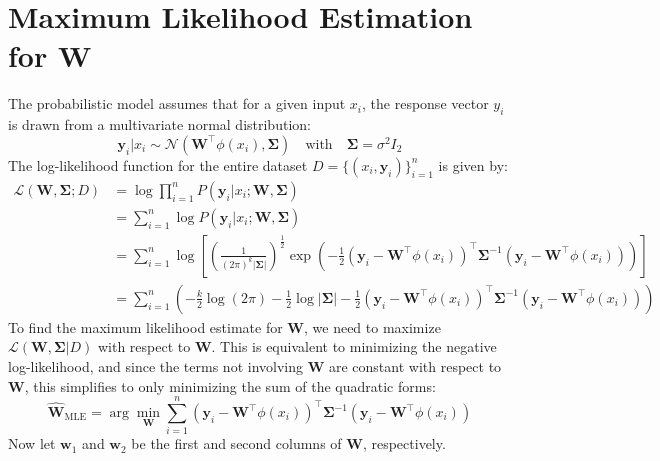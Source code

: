 \documentclass[11pt, a4paper, oneside]{memoir}
\begin{document}
\section[Maximum Likelihood Estimation for W]{Maximum Likelihood Estimation for $\mathbf{W}$}
The probabilistic model assumes that for a given input $x_i$, the response vector $y_i$ is drawn from a multivariate normal distribution:
\[ \mathbf{y}_i | x_i \sim \mathcal{N}(\mathbf{W}^\top\phi(x_i), \mathbf{\Sigma}) \quad \text{with} \quad \mathbf{\Sigma} = \sigma^2\mathit{I}_2 \]
The log-likelihood function for the entire dataset $D = \{(x_i, \mathbf{y}_i)\}_{i=1}^n$ is given by:
\begin{align*}
    \mathcal{L}(\mathbf{W}, \mathbf{\Sigma} ; D) & = \log \prod_{i=1}^n P(\mathbf{y}_i | x_i; \mathbf{W}, \mathbf{\Sigma})                                                                                                                                                                     \\
                                                 & = \sum_{i=1}^n \log P(\mathbf{y}_i | x_i; \mathbf{W}, \mathbf{\Sigma})                                                                                                                                                                      \\
                                                 & = \sum_{i=1}^n \log \left[ \left( \frac{1}{(2\pi)^k|\mathbf{\Sigma}|} \right)^{\frac{1}{2}} \exp\left(-\frac{1}{2}(\mathbf{y}_i - \mathbf{W}^\top\phi(x_i))^\top\mathbf{\Sigma}^{-1}(\mathbf{y}_i - \mathbf{W}^\top\phi(x_i))\right)\right] \\
                                                 & = \sum_{i=1}^n \left( -\frac{k}{2}\log(2\pi) - \frac{1}{2}\log|\mathbf{\Sigma}| - \frac{1}{2}(\mathbf{y}_i - \mathbf{W}^\top\phi(x_i))^\top\mathbf{\Sigma}^{-1}(\mathbf{y}_i - \mathbf{W}^\top\phi(x_i)) \right)
\end{align*}
To find the maximum likelihood estimate for $\mathbf{W}$, we need to maximize $\mathcal{L}(\mathbf{W}, \mathbf{\Sigma} | D)$ with respect to $\mathbf{W}$.
This is equivalent to minimizing the negative log-likelihood, and since the terms not involving $\mathbf{W}$ are constant with respect to $\mathbf{W}$,
this simplifies to only minimizing the sum of the quadratic forms:
\[ \hat{\mathbf{W}}_{\text{MLE}} = \arg\min_{\mathbf{W}} \sum_{i=1}^n (\mathbf{y}_i - \mathbf{W}^\top\phi(x_i))^\top\mathbf{\Sigma}^{-1}(\mathbf{y}_i - \mathbf{W}^\top\phi(x_i)) \]
Now let $\mathbf{w}_1$ and $\mathbf{w}_2$ be the first and second columns of $\mathbf{W}$, respectively.
\end{document}
